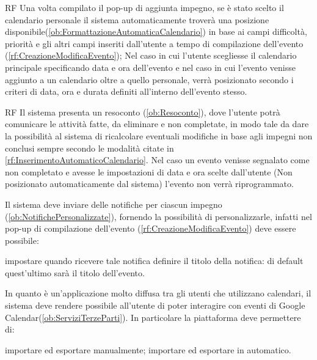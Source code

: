\begin{listaPersonale}{RF}
 Una volta compilato il pop-up di aggiunta impegno, se è stato scelto il calendario personale il sistema automaticamente troverà una posizione disponibile(\ref{ob:FormattazioneAutomaticaCalendario}) in base ai campi difficoltà, priorità e gli altri campi inseriti dall'utente a tempo di compilazione dell'evento (\ref{rf:CreazioneModificaEvento}); Nel caso in cui l'utente scegliesse il calendario principale specificando data e ora dell'evento e nel caso in cui l'evento venisse aggiunto a un calendario oltre a quello personale, verrà posizionato secondo i criteri di data, ora e durata definiti all'interno dell'evento stesso.

	\begin{listaPersonale2}{RF}
 Il sistema presenta un resoconto (\ref{ob:Resoconto}), dove l'utente potrà comunicare le attività fatte, da eliminare e non completate, in modo tale da dare la possibilità al sistema di ricalcolare eventuali modifiche in base agli impegni non conclusi sempre secondo le modalità citate in \ref{rf:InserimentoAutomaticoCalendario}. Nel caso un evento venisse segnalato come non completato e avesse le impostazioni di data e ora scelte dall'utente (Non posizionato automaticamente dal sistema) l'evento non verrà riprogrammato.
	\end{listaPersonale2}

	 Il sistema deve inviare delle notifiche per ciascun impegno (\ref{ob:NotifichePersonalizzate}), fornendo la possibilità di personalizzarle, infatti nel pop-up di compilazione dell'evento (\ref{rf:CreazioneModificaEvento}) deve essere possibile:
	\begin{listaPersonale2}{}
		 impostare quando ricevere tale notifica
		 definire il titolo della notifica: di default quest'ultimo sarà il titolo dell'evento.
	\end{listaPersonale2}

 In quanto è un'applicazione molto diffusa tra gli utenti che utilizzano calendari, il sistema deve rendere possibile all'utente di poter interagire con eventi di Google Calendar(\ref{ob:ServiziTerzeParti}). In particolare la piattaforma deve permettere di:
\begin{listaPersonale2}{}
			 importare ed esportare manualmente;
 importare ed esportare in automatico.
\end{listaPersonale2}


\end{listaPersonale}
